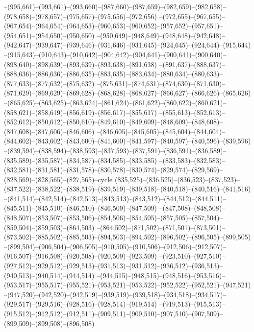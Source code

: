 --(995,661)--(993,661)--(993,660)--(987,660)--(987,659)--(982,659)--(982,658)--(978,658)--(978,657)--(975,657)--(975,656)--(972,656)
--(972,655)--(967,655)--(967,654)--(964,654)--(964,653)--(960,653)--(960,652)--(957,652)--(957,651)--(954,651)--(954,650)--(950,650)
--(950,649)--(948,649)--(948,648)--(942,648)--(942,647)--(939,647)--(939,646)--(931,646)--(931,645)--(924,645)--(924,644)--(915,644)
--(915,643)--(910,643)--(910,642)--(904,642)--(904,641)--(900,641)--(900,640)--(898,640)--(898,639)--(893,639)--(893,638)--(891,638)
--(891,637)--(888,637)--(888,636)--(886,636)--(886,635)--(883,635)--(883,634)--(880,634)--(880,633)--(877,633)--(877,632)--(875,632)
--(875,631)--(874,631)--(874,630)--(871,630)--(871,629)--(869,629)--(869,628)--(868,628)--(868,627)--(866,627)--(866,626)--(865,626)
--(865,625)--(863,625)--(863,624)--(861,624)--(861,622)--(860,622)--(860,621)--(858,621)--(858,619)--(856,619)--(856,617)--(855,617)
--(855,613)--(852,613)--(852,612)--(850,612)--(850,610)--(849,610)--(849,609)--(848,609)--(848,608)--(847,608)--(847,606)--(846,606)
--(846,605)--(845,605)--(845,604)--(844,604)--(844,602)--(843,602)--(843,600)--(841,600)--(841,597)--(840,597)--(840,596)--(839,596)
--(839,594)--(838,594)--(838,593)--(837,593)--(837,591)--(836,591)--(836,589)--(835,589)--(835,587)--(834,587)--(834,585)--(833,585)
--(833,583)--(832,583)--(832,581)--(831,581)--(831,578)--(830,578)--(830,574)--(829,574)--(829,569)--(828,569)--(828,565)--(827,565)--cycle
(835,525)--(836,525)--(836,523)--(837,523)--(837,522)--(838,522)--(838,519)--(839,519)--(839,518)--(840,518)--(840,516)--(841,516)
--(841,514)--(842,514)--(842,513)--(843,513)--(843,512)--(844,512)--(844,511)--(845,511)--(845,510)--(846,510)--(846,509)--(847,509)
--(847,508)--(848,508)--(848,507)--(853,507)--(853,506)--(854,506)--(854,505)--(857,505)--(857,504)--(859,504)--(859,503)--(864,503)
--(864,502)--(871,502)--(871,501)--(873,501)--(873,502)--(885,502)--(885,503)--(894,503)--(894,502)--(896,502)--(896,505)--(899,505)
--(899,504)--(906,504)--(906,505)--(910,505)--(910,506)--(912,506)--(912,507)--(916,507)--(916,508)--(920,508)--(920,509)--(923,509)
--(923,510)--(927,510)--(927,512)--(929,512)--(929,513)--(931,513)--(931,512)--(936,512)--(936,513)--(940,513)--(940,514)--(944,514)
--(944,515)--(948,515)--(948,516)--(953,516)--(953,517)--(955,517)--(955,521)--(953,521)--(953,522)--(952,522)--(952,521)--(947,521)
--(947,520)--(942,520)--(942,519)--(939,519)--(939,518)--(934,518)--(934,517)--(929,517)--(929,516)--(928,516)--(928,514)--(919,514)
--(919,513)--(915,513)--(915,512)--(912,512)--(912,511)--(909,511)--(909,510)--(907,510)--(907,509)--(899,509)--(899,508)--(896,508)
